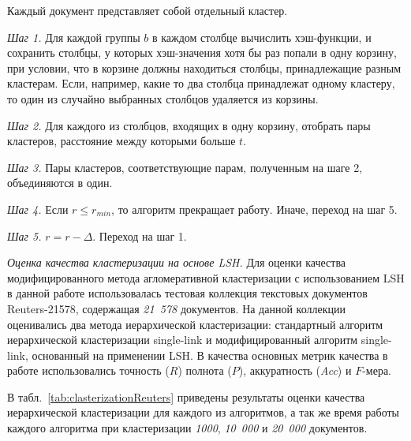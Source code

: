 Каждый документ представляет собой отдельный кластер.

\textit{Шаг 1.} Для каждой группы \(b\) в каждом столбце вычислить хэш-функции, и сохранить столбцы, у которых хэш-значения хотя бы раз попали в одну корзину, при условии, что в корзине должны находиться столбцы, принадлежащие разным кластерам. Если, например, какие то два столбца принадлежат одному кластеру, то один из случайно выбранных столбцов удаляется из корзины.

\textit{Шаг 2.} Для каждого из столбцов, входящих в одну корзину, отобрать пары кластеров, расстояние между которыми больше \(t\).

\textit{Шаг 3.} Пары кластеров, соответствующие парам, полученным на шаге 2, объединяются в один.

\textit{Шаг 4.} Если \(r \leq r_\textit{min}\), то алгоритм прекращает работу. Иначе, переход на шаг 5.

\textit{Шаг 5.} \(r = r - \Delta\). Переход на шаг 1.

\textit{Оценка качества кластеризации на основе LSH.} Для оценки качества модифицированного метода агломеративной кластеризации с использованием LSH в данной работе использовалась тестовая коллекция текстовых документов Reuters-21578, содержащая \textit{21 578} документов. На данной коллекции оценивались два метода иерархической кластеризации: стандартный алгоритм иерархической кластеризации single-link и модифицированный алгоритм single-link, основанный на применении LSH. В качества основных метрик качества в работе использовались точность (\(R\)) полнота (\(P\)), аккуратность (\textit{Acc}) и \(F\)-мера.

В табл.~\cref{tab:clasterizationReuters} приведены результаты оценки качества иерархической кластеризации для каждого из алгоритмов, а так же время работы каждого алгоритма при кластеризации \textit{1000}, \textit{10 000} и \textit{20 000} документов.

